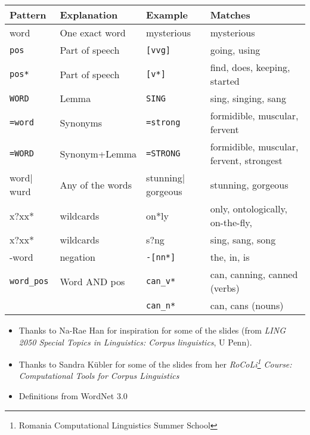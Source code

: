 \documentclass[a4paper,landscape,headrule,footrule,xetex]{foils}
\begin{document}
\begin{small}
  \begin{tabular}{llll}
    Pattern & Explanation & Example & Matches \\ \hline
    word & One exact word & mysterious  & mysterious \\
    \texttt{pos} & Part of speech & \texttt{[vvg]} & going, using \\
    \texttt{pos*} & Part of speech & \texttt{[v*]} & find, does, keeping, started  \\
    \texttt{WORD} & Lemma & \texttt{SING} & sing, singing, sang \\
    \texttt{=word} & Synonyms & \texttt{=strong} & 	formidible, muscular, fervent \\
    \texttt{=WORD} & Synonym+Lemma & \texttt{=STRONG} & 	formidible, muscular, fervent, strongest \\
    word$|$wurd & Any of the words & stunning$|$gorgeous & stunning, gorgeous \\
    x?xx* & wildcards & on*ly & only, ontologically, on-the-fly, \\
    x?xx* & wildcards & s?ng & sing, sang, song \\
    -word & negation & \texttt{-[nn*]} & the, in, is \\
    \texttt{word\_pos} & Word AND pos& \texttt{can\_v*} & can, canning, canned (verbs)\\ 
& & \texttt{can\_n*} & can, cans (nouns)\\
  \end{tabular}
\end{small}






\begin{itemize}
\item Thanks to Na-Rae Han for 
  inspiration for some of the slides (from  \textit{LING 2050 Special Topics in Linguistics: Corpus linguistics}, U Penn).
\item Thanks to Sandra K\"{u}bler for some of the slides from her 
\textit{RoCoLi\footnote{Romania Computational Linguistics Summer School} Course: Computational Tools for Corpus Linguistics}
\item Definitions from WordNet 3.0
\end{itemize}



\end{document}
